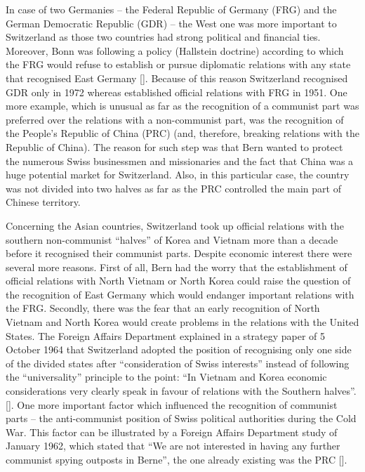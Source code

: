 \documentclass[a4paper]{article}
\begin{document}
In case of two Germanies – the Federal Republic of Germany (FRG) and the German Democratic Republic (GDR) – the West one was more important to Switzerland as those two countries had strong political and financial ties. Moreover, Bonn was following a policy (Hallstein doctrine) according to which the FRG would refuse to establish or pursue diplomatic relations with any state that recognised East Germany []. Because of this reason Switzerland recognised GDR only in 1972 whereas established official relations with FRG in 1951. One more example, which is unusual as far as the recognition of a communist part was preferred over the relations with a non-communist part, was the recognition of the People’s Republic of China (PRC) (and, therefore, breaking relations with the Republic of China). The reason for such step was that Bern wanted to protect the numerous Swiss businessmen and missionaries and the fact that China was a huge potential market for Switzerland. Also, in this particular case, the country was not divided into two halves as far as the PRC controlled the main part of Chinese territory.

Concerning the Asian countries, Switzerland took up official relations with the southern non-communist “halves” of Korea and Vietnam more than a decade before it recognised their communist parts. Despite economic interest there were several more reasons. First of all, Bern had the worry that the establishment of official relations with North Vietnam or North Korea could raise the question of the recognition of East Germany which would endanger important relations with the FRG. Secondly, there was the fear that an early recognition of North Vietnam and North Korea would create problems in the relations with the United States. The Foreign Affairs Department explained in a strategy paper of 5 October 1964 that Switzerland adopted the position of recognising only one side of the divided states after “consideration of Swiss interests” instead of following the “universality” principle to the point: “In Vietnam and Korea economic considerations very clearly speak in favour of relations with the Southern halves”.[]. One more important factor which influenced the recognition of communist parts – the anti-communist position of Swiss political authorities during the Cold War. This factor can be illustrated by a Foreign Affairs Department study of January 1962, which stated that “We are not interested in having any further communist spying outposts in Berne”, the one already existing was the PRC [].
\end{document}
